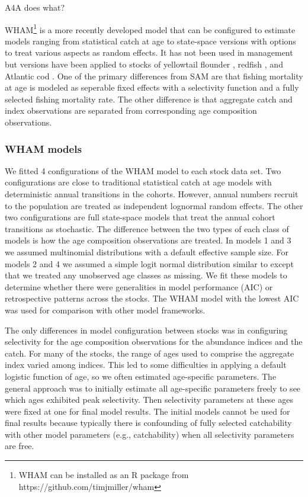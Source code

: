 \documentclass[12pt,letterpaper, leqno]{article}
\begin{document}
A4A does what?


WHAM\footnote{WHAM can be installed as an R package from https://github.com/timjmiller/wham} is a more recently developed model that can be configured to estimate models ranging from statistical catch at age to state-space versions with options to treat various aspects as random effects. It has not been used in management but versions have been applied to stocks of yellowtail flounder \citep{milleretal16}, redfish \citep{millerhyun18}, and Atlantic cod \citep{milleretal18}. One of the primary differences from SAM are that  fishing mortality at age is modeled as seperable fixed effects with a selectivity function and a fully selected fishing mortality rate. The other difference is that aggregate catch and index observations are separated from corresponding age composition observations. 


\subsubsection*{WHAM models}

We fitted 4 configurations of the WHAM model to each stock data set. Two configurations are close to traditional statistical catch at age models with deterministic annual transitions in the cohorts. However, annual numbers recruit to the population are treated as independent lognormal random effects. The other two configurations are full state-space models that treat the annual cohort transitions as stochastic. The difference between the two types of each class of models is how the age composition observations are treated. In models 1 and 3 we assumed multinomial distributions with a default effective sample size. For models 2 and 4 we assumed a simple logit normal distribution similar to \citet{milleretal16} except that we treated any unobserved age classes as missing. We fit these models to determine whether there were generalities in model performance (AIC) or retrospective patterns across the stocks. The WHAM model with the lowest AIC was used for comparison with other model frameworks.

The only differences in model configuration between stocks was in configuring selectivity for the age composition observations for the abundance indices and the catch. For many of the stocks, the range of ages used to comprise the aggregate index varied among indices. This led to some difficulties in applying a default logistic function of age, so we often estimated age-specific parameters. The general approach was to initially estimate all age-specific parameters freely to see which ages exhibited peak selectivity. Then selectivity parameters at these ages were fixed at one for final model results. The initial models cannot be used for final results because typically there is confounding of fully selected catchability with other model parameters (e.g., catchability) when all selectivity parameters are free.
\end{document}
